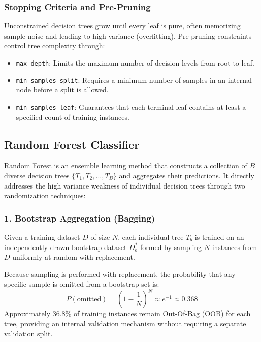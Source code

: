 \documentclass[12pt,a4paper]{article}
\begin{document}
\subsubsection*{Stopping Criteria and Pre-Pruning}
Unconstrained decision trees grow until every leaf is pure, often memorizing sample noise and leading to high variance (overfitting). Pre-pruning constraints control tree complexity through:
\begin{itemize}
\item \texttt{max\_depth}: Limits the maximum number of decision levels from root to leaf.
\item \texttt{min\_samples\_split}: Requires a minimum number of samples in an internal node before a split is allowed.
\item \texttt{min\_samples\_leaf}: Guarantees that each terminal leaf contains at least a specified count of training instances.
\end{itemize}

\subsection{Random Forest Classifier}

Random Forest is an ensemble learning method that constructs a collection of $B$ diverse decision trees $\{T_1, T_2, \dots, T_B\}$ and aggregates their predictions. It directly addresses the high variance weakness of individual decision trees through two randomization techniques:

\subsubsection*{1. Bootstrap Aggregation (Bagging)}
Given a training dataset $D$ of size $N$, each individual tree $T_b$ is trained on an independently drawn bootstrap dataset $D_b^*$ formed by sampling $N$ instances from $D$ uniformly at random with replacement.

Because sampling is performed with replacement, the probability that any specific sample is omitted from a bootstrap set is:
\begin{equation}
P(\text{omitted}) = \left( 1 - \frac{1}{N} \right)^N \approx e^{-1} \approx 0.368
\end{equation}
Approximately 36.8\% of training instances remain Out-Of-Bag (OOB) for each tree, providing an internal validation mechanism without requiring a separate validation split.
\end{document}
